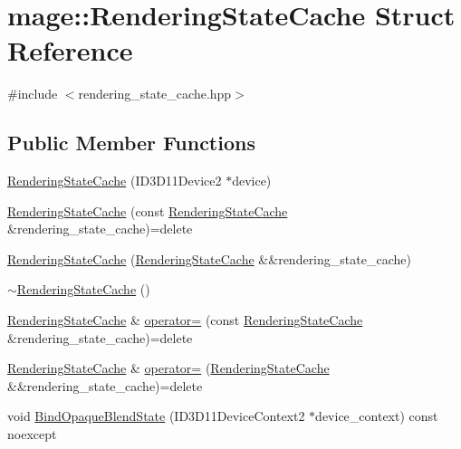\hypertarget{structmage_1_1_rendering_state_cache}{}\section{mage\+:\+:Rendering\+State\+Cache Struct Reference}
\label{structmage_1_1_rendering_state_cache}


{\ttfamily \#include $<$rendering\+\_\+state\+\_\+cache.\+hpp$>$}

\subsection*{Public Member Functions}
\begin{DoxyCompactItemize}
\item 
\hyperlink{structmage_1_1_rendering_state_cache_ad818eaa6c950c5851d6e684b9a4b3a65}{Rendering\+State\+Cache} (I\+D3\+D11\+Device2 $\ast$device)
\item 
\hyperlink{structmage_1_1_rendering_state_cache_a47c0f5527ce10ca9b6a059946efda239}{Rendering\+State\+Cache} (const \hyperlink{structmage_1_1_rendering_state_cache}{Rendering\+State\+Cache} \&rendering\+\_\+state\+\_\+cache)=delete
\item 
\hyperlink{structmage_1_1_rendering_state_cache_aacdb082df6180f0fe6a76f54b7b2f776}{Rendering\+State\+Cache} (\hyperlink{structmage_1_1_rendering_state_cache}{Rendering\+State\+Cache} \&\&rendering\+\_\+state\+\_\+cache)
\item 
\hyperlink{structmage_1_1_rendering_state_cache_ac727351db3d929df122327887edc3668}{$\sim$\+Rendering\+State\+Cache} ()
\item 
\hyperlink{structmage_1_1_rendering_state_cache}{Rendering\+State\+Cache} \& \hyperlink{structmage_1_1_rendering_state_cache_a9534ceabde1d3f9f318f90d2ceec7646}{operator=} (const \hyperlink{structmage_1_1_rendering_state_cache}{Rendering\+State\+Cache} \&rendering\+\_\+state\+\_\+cache)=delete
\item 
\hyperlink{structmage_1_1_rendering_state_cache}{Rendering\+State\+Cache} \& \hyperlink{structmage_1_1_rendering_state_cache_aac885d9a83e196299ac896b3847f471b}{operator=} (\hyperlink{structmage_1_1_rendering_state_cache}{Rendering\+State\+Cache} \&\&rendering\+\_\+state\+\_\+cache)=delete
\item 
void \hyperlink{structmage_1_1_rendering_state_cache_ad00fcf84f2dc269a1abbf2ece3c653c4}{Bind\+Opaque\+Blend\+State} (I\+D3\+D11\+Device\+Context2 $\ast$device\+\_\+context) const noexcept

\end{DoxyCompactItemize}
